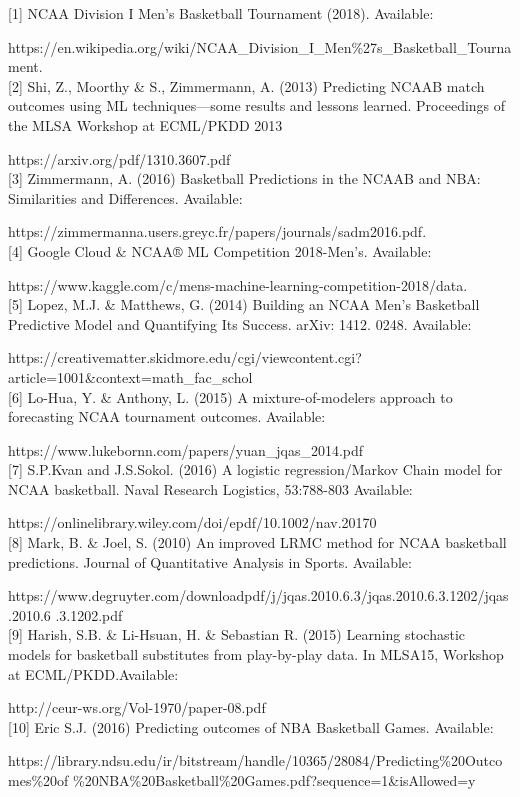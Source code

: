 \documentclass[12pt]{article}
\begin{document}
\small

[1]	NCAA Division I Men's Basketball Tournament (2018). Available: 

https://en.wikipedia.org/wiki/NCAA\_Division\_I\_Men\%27s\_Basketball\_Tournament. \\

[2]	Shi, Z., Moorthy \& S.,  Zimmermann, A. (2013) Predicting NCAAB match outcomes using ML techniques—some results and lessons learned. Proceedings of the MLSA Workshop at ECML/PKDD 2013

https://arxiv.org/pdf/1310.3607.pdf \\

[3]	Zimmermann, A. (2016) Basketball Predictions in the NCAAB and NBA: Similarities and Differences. Available: 

https://zimmermanna.users.greyc.fr/papers/journals/sadm2016.pdf.\\

[4]	Google Cloud \& NCAA® ML Competition 2018-Men's. Available: 

https://www.kaggle.com/c/mens-machine-learning-competition-2018/data. \\

[5]	Lopez, M.J. \& Matthews, G. (2014) Building an NCAA Men's Basketball Predictive Model and Quantifying Its Success. arXiv: 1412. 0248. Available:

            https://creativematter.skidmore.edu/cgi/viewcontent.cgi?article=1001\&context=math\_fac\_schol \\

[6]       Lo-Hua, Y. \& Anthony, L. (2015) A mixture-of-modelers approach to forecasting NCAA tournament outcomes. Available:

            https://www.lukebornn.com/papers/yuan\_jqas\_2014.pdf \\

[7]       S.P.Kvan and J.S.Sokol. (2016) A logistic regression/Markov Chain model for NCAA basketball. Naval Research Logistics, 53:788-803 Available:

            https://onlinelibrary.wiley.com/doi/epdf/10.1002/nav.20170 \\

[8]       Mark, B. \& Joel, S. (2010) An improved LRMC method for NCAA basketball predictions. Journal of Quantitative Analysis in Sports. Available:

https://www.degruyter.com/downloadpdf/j/jqas.2010.6.3/jqas.2010.6.3.1202/jqas.2010.6
.3.1202.pdf \\
	
[9]       Harish, S.B. \& Li-Hsuan, H. \& Sebastian R. (2015) Learning stochastic models for basketball substitutes from play-by-play data. In MLSA15, Workshop at ECML/PKDD.Available:

        	http://ceur-ws.org/Vol-1970/paper-08.pdf\\

[10]     Eric S.J. (2016) Predicting outcomes of NBA Basketball Games. Available:

https://library.ndsu.edu/ir/bitstream/handle/10365/28084/Predicting\%20Outcomes\%20of      \%20NBA\%20Basketball\%20Games.pdf?sequence=1\&isAllowed=y\\
\end{document}
